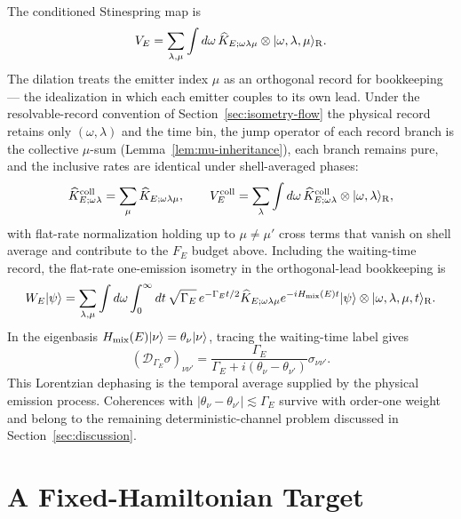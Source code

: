 \documentclass[12pt]{article}
\newcommand{\ket}[1]{|#1\rangle}
\begin{document}
The conditioned Stinespring map is
\begin{equation}
    V_E=
    \sum_{\lambda,\mu}\int d\omega\,
    \widehat K_{E;\omega\lambda\mu}
    \otimes\ket{\omega,\lambda,\mu}_{\rm R}.
\end{equation}
The dilation treats the emitter index $\mu$ as an orthogonal record for
bookkeeping --- the idealization in which each emitter couples to its own
lead.  Under the resolvable-record convention of
Section~\ref{sec:isometry-flow} the physical record retains only
$(\omega,\lambda)$ and the time bin, the jump operator of each record
branch is the collective $\mu$-sum
(Lemma~\ref{lem:mu-inheritance}), each branch remains pure, and the
inclusive rates are identical under shell-averaged phases:
\begin{equation}
    \widehat K^{\rm coll}_{E;\omega\lambda}
    =\sum_\mu \widehat K_{E;\omega\lambda\mu},
    \qquad
    V_E^{\rm coll}
    =\sum_{\lambda}\int d\omega\,
    \widehat K^{\rm coll}_{E;\omega\lambda}
    \otimes\ket{\omega,\lambda}_{\rm R},
\end{equation}
with flat-rate normalization holding up to $\mu\neq\mu'$ cross terms that
vanish on shell average and contribute to the $F_E$ budget above.
Including the waiting-time record, the flat-rate one-emission isometry in
the orthogonal-lead bookkeeping is
\begin{equation}
    W_E\ket\psi
    =
    \sum_{\lambda,\mu}\int d\omega\int_0^\infty dt\,
    \sqrt{\Gamma_E}\,e^{-\Gamma_Et/2}
    \widehat K_{E;\omega\lambda\mu}
    e^{-iH_{\rm mix}(E)t}\ket\psi
    \otimes\ket{\omega,\lambda,\mu,t}_{\rm R}.
\end{equation}
In the eigenbasis $H_{\rm mix}(E)\ket\nu=\theta_\nu\ket\nu$, tracing the
waiting-time label gives
\begin{equation}
    (\mathcal D_{\Gamma_E}\sigma)_{\nu\nu'}
    =
    \frac{\Gamma_E}{\Gamma_E+i(\theta_\nu-\theta_{\nu'})}
    \sigma_{\nu\nu'} .
\end{equation}
This Lorentzian dephasing is the temporal average supplied by the physical
emission process.  Coherences with
$|\theta_\nu-\theta_{\nu'}|\lesssim\Gamma_E$ survive with order-one weight and
belong to the remaining deterministic-channel problem discussed in
Section~\ref{sec:discussion}.

\section{A Fixed-Hamiltonian Target}
\label{app:fixed-hamiltonian-target}
\end{document}
